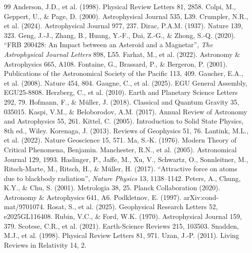 \documentclass[12pt]{article}
\theoremstyle{remark}
\begin{document}
	\begin{thebibliography}{99}
		 Anderson, J.D., et al. (1998). Physical Review Letters 81, 2858.
		 Colpi, M., Geppert, U., \& Page, D. (2000). Astrophysical Journal 535, L39.
		 Crumpler, N.R., et al. (2024). Astrophysical Journal 977, 237.
		 Dirac, P.A.M. (1937). Nature 139, 323.
		 Geng, J.-J., Zhang, B., Huang, Y.-F., Dai, Z.-G., \& Zhong, S.-Q. (2020). ``FRB 200428: An Impact between an Asteroid and a Magnetar'', \emph{The Astrophysical Journal Letters} 898, L55.
		 Farhat, M., et al. (2022). Astronomy \& Astrophysics 665, A108.
		 Fontaine, G., Brassard, P., \& Bergeron, P. (2001). Publications of the Astronomical Society of the Pacific 113, 409.
		 Gaucher, E.A., et al. (2008). Nature 454, 804.
		 Gaugne, C., et al. (2025). EGU General Assembly, EGU25-8808.
		 Herzberg, C., et al. (2010). Earth and Planetary Science Letters 292, 79.
		 Hofmann, F., \& Müller, J. (2018). Classical and Quantum Gravity 35, 035015.
		 Kaspi, V.M., \& Beloborodov, A.M. (2017). Annual Review of Astronomy and Astrophysics 55, 261.
		 Kittel, C. (2005). Introduction to Solid State Physics, 8th ed., Wiley.
		 Korenaga, J. (2013). Reviews of Geophysics 51, 76.
		 Lantink, M.L., et al. (2022). Nature Geoscience 15, 571.
		 Ma, S.-K. (1976). Modern Theory of Critical Phenomena, Benjamin.
		 Manchester, R.N., et al. (2005). Astronomical Journal 129, 1993.
		 Haslinger, P., Jaffe, M., Xu, V., Schwartz, O., Sonnleitner, M., Ritsch-Marte, M., Ritsch, H., \& Müller, H. (2017). ``Attractive force on atoms due to blackbody radiation'', \emph{Nature Physics} 13, 1138–1142.
		 Peters, A., Chung, K.Y., \& Chu, S. (2001). Metrologia 38, 25.
		 Planck Collaboration (2020). Astronomy \& Astrophysics 641, A6.
		 Podkletnov, E. (1997). arXiv:cond-mat/9701074.
		 Rosat, S., et al. (2025). Geophysical Research Letters 52, e2025GL116408.
		 Rubin, V.C., \& Ford, W.K. (1970). Astrophysical Journal 159, 379.
		 Scotese, C.R., et al. (2021). Earth-Science Reviews 215, 103503.
		 Snadden, M.J., et al. (1998). Physical Review Letters 81, 971.
		 Uzan, J.-P. (2011). Living Reviews in Relativity 14, 2.

\end{thebibliography}
\end{document}
